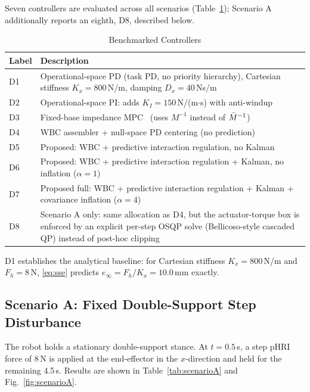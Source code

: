 Seven controllers are evaluated across all scenarios (Table~\ref{tab:controllers});
Scenario A additionally reports an eighth, D8, described below.

\begin{table}[!t]
\caption{Benchmarked Controllers}
\label{tab:controllers}
\renewcommand{\arraystretch}{1.2}
\begin{tabular}{lp{6cm}}
\toprule
\textbf{Label} & \textbf{Description} \\
\midrule
D1 & Operational-space PD (task PD, no priority hierarchy), Cartesian stiffness $K_x=800$\,N/m, damping $D_x=40$\,Ns/m \\
D2 & Operational-space PI: adds $K_I=150$\,N/(m$\cdot$s) with anti-windup \\
D3 & Fixed-base impedance MPC~\cite{cao2026impedance} (uses $M^{-1}$ instead of $\bar{M}^{-1}$) \\
D4 & WBC assembler + null-space PD centering (no prediction) \\
D5 & Proposed: WBC + predictive interaction regulation, no Kalman \\
D6 & Proposed: WBC + predictive interaction regulation + Kalman, no inflation ($\alpha=1$) \\
D7 & Proposed full: WBC + predictive interaction regulation + Kalman + covariance inflation ($\alpha=4$) \\
D8 & Scenario A only: same allocation as D4, but the actuator-torque box is
enforced by an explicit per-step OSQP solve (Bellicoso-style cascaded QP)
instead of post-hoc clipping \\
\bottomrule
\end{tabular}
\end{table}

D1 establishes the analytical baseline: for Cartesian stiffness
$K_x=800$\,N/m and $F_h=8$\,N, \eqref{eq:sse} predicts
$e_\infty=F_h/K_x=10.0$\,mm exactly.

\subsection{Scenario A: Fixed Double-Support Step Disturbance}

The robot holds a stationary double-support stance.
At $t=0.5$\,s, a step pHRI force of 8\,N is applied at the end-effector in
the $x$-direction and held for the remaining 4.5\,s.
Results are shown in Table~\ref{tab:scenarioA} and Fig.~\ref{fig:scenarioA}.

